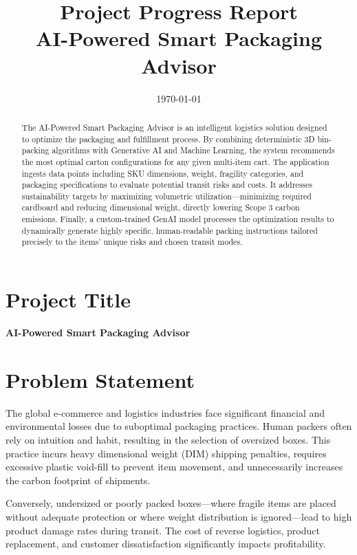 \documentclass[12pt,a4paper]{article}
\title{\textbf{Project Progress Report} \\ \Large AI-Powered Smart Packaging Advisor}
\author{}
\date{\today}
\begin{document}
\maketitle

\begin{abstract}
The AI-Powered Smart Packaging Advisor is an intelligent logistics solution designed to optimize the packaging and fulfillment process. By combining deterministic 3D bin-packing algorithms with Generative AI and Machine Learning, the system recommends the most optimal carton configurations for any given multi-item cart. The application ingests data points including SKU dimensions, weight, fragility categories, and packaging specifications to evaluate potential transit risks and costs. It addresses sustainability targets by maximizing volumetric utilization—minimizing required cardboard and reducing dimensional weight, directly lowering Scope 3 carbon emissions. Finally, a custom-trained GenAI model processes the optimization results to dynamically generate highly specific, human-readable packing instructions tailored precisely to the items' unique risks and chosen transit modes.
\end{abstract}

\newpage
\tableofcontents
\newpage

\section{Project Title}
\textbf{AI-Powered Smart Packaging Advisor}

\section{Problem Statement}
The global e-commerce and logistics industries face significant financial and environmental losses due to suboptimal packaging practices. Human packers often rely on intuition and habit, resulting in the selection of oversized boxes. This practice incurs heavy dimensional weight (DIM) shipping penalties, requires excessive plastic void-fill to prevent item movement, and unnecessarily increases the carbon footprint of shipments. 

Conversely, undersized or poorly packed boxes—where fragile items are placed without adequate protection or where weight distribution is ignored—lead to high product damage rates during transit. The cost of reverse logistics, product replacement, and customer dissatisfaction significantly impacts profitability. 
\end{document}
